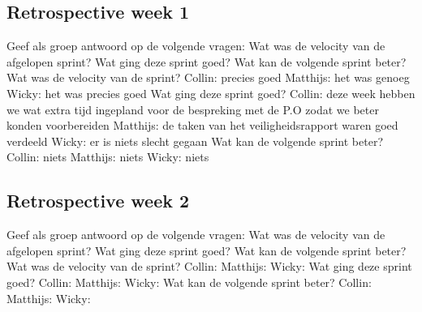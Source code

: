 \documentclass[12pt, a4paper]{extarticle}
\begin{document}
	\subsection{Retrospective week 1}
Geef als groep antwoord op de volgende vragen: 
 \newline
Wat was de velocity van de afgelopen sprint?  
 \newline
Wat ging deze sprint goed? 
 \newline 
Wat kan de volgende sprint beter?  
 \vspace{5mm}
 \newline
Wat was de velocity van de sprint? 
 \newline
Collin: precies goed 
 \newline
Matthijs: het was genoeg 
 \newline 
Wicky: het was precies goed   
 \vspace{5mm}
 \newline
Wat ging deze sprint goed?  
 \newline 
Collin: deze week hebben we wat extra tijd ingepland voor de bespreking met de P.O zodat we beter konden voorbereiden  
 \newline 
Matthijs: de taken van het veiligheidsrapport waren goed verdeeld 
 \newline  
Wicky: er is niets slecht gegaan 
 \vspace{5mm}
 \newline
Wat kan de volgende sprint beter? 
 \newline 
Collin: niets 
 \newline 
Matthijs: niets 
 \newline 
Wicky: niets  
 \newline 
	
	
\subsection{Retrospective week 2}
Geef als groep antwoord op de volgende vragen: 
\newline
Wat was de velocity van de afgelopen sprint?  
\newline
Wat ging deze sprint goed? 
\newline 
Wat kan de volgende sprint beter?  
\vspace{5mm}
\newline
Wat was de velocity van de sprint? 
\newline
Collin: 
\newline
Matthijs: 
\newline 
Wicky:   
\vspace{5mm}
\newline
Wat ging deze sprint goed?  
\newline 
Collin: 
\newline 
Matthijs: 
\newline  
Wicky:  
\vspace{5mm}
\newline
Wat kan de volgende sprint beter? 
\newline 
Collin: 
\newline 
Matthijs: 
\newline 
Wicky:  
\newline 
	
	\newpage
	
	
	
	
\end{document}
